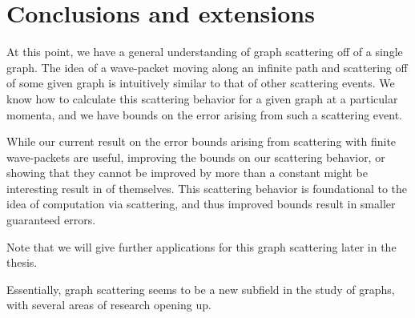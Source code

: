 \documentclass[../thesis-main/thesis-main]{subfiles}
\begin{document}
\section{Conclusions and extensions}

At this point, we have a general understanding of graph scattering off of a single graph.  The idea of a wave-packet moving along an infinite path  and scattering off of some given graph is intuitively similar to that of other scattering events.  We know how to calculate this scattering behavior for a given graph at a particular momenta, and we have bounds on the error arising from such a scattering event.

While our current result on the error bounds arising from scattering with finite wave-packets are useful, improving the bounds on our scattering behavior, or showing that they cannot be improved by more than a constant might be interesting result in of themselves.  This scattering behavior is foundational to the idea of computation via scattering, and thus improved bounds result in smaller guaranteed errors.

Note that we will give further applications for this graph scattering later in the thesis.


Essentially, graph scattering seems to be a new subfield in the study of graphs, with several areas of research opening up.

\biblio{}
\end{document}
